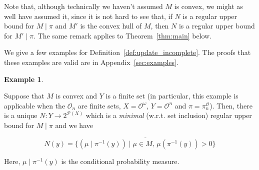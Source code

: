 \documentclass[11pt]{article}
\theoremstyle{definition}
\newtheorem{example}{Example}%
\theoremstyle{plain}
\newcommand{\Comment}[1]{}
\newcommand{\Nats}{\mathbb{N}}
\newcommand{\PM}{\mathcal{P}}
\newcommand{\Ob}{\mathcal{O}}
\newcommand{\OO}{\Ob^\omega}
\newcommand{\PO}{\pi^\Ob}
\newcommand{\PMO}{\PM(\OO)}
\begin{document}
Note that, although technically we haven't assumed $M$ is convex, we might as well have assumed it, since it is not hard to see that, if $N$ is a regular upper bound for $M \mid \pi$ and $M'$ is the convex hull of $M$, then $N$ is a regular upper bound for $M' \mid \pi$. The same remark applies to Theorem~\ref{thm:main} below.

We give a few examples for Definition~\ref{def:update_incomplete}. The proofs that these examples are valid are in Appendix~\ref{sec:examples}.

\begin{samepage}
\begin{example}
\label{exm:update_incomplete_finite}

Suppose that $M$ is convex and $Y$ is a finite set (in particular, this example is applicable when the $\Ob_n$ are finite sets, $X=\OO$, $Y=\Ob^n$ and $\pi=\PO_n$). Then, there is a unique $N: Y \rightarrow 2^{\PM(X)}$ which is a \emph{minimal} (w.r.t. set inclusion) regular upper bound for $M \mid \pi$ and we have

\begin{equation}
\label{eqn:exm__update_incomplete_finite}
N(y) = \overline{\{\left(\mu \mid \pi^{-1}(y)\right) \mid \mu \in M,\, \mu\left(\pi^{-1}(y)\right) > 0\}}
\end{equation}

Here, $\mu \mid \pi^{-1}(y)$ is the conditional probability measure.

\end{example}
\end{samepage}
%
\Comment{\begin{samepage}
\begin{example}

Suppose that $M$ is convex, for each $n \in \Nats$, $\Ob_n = [0,1]$ and for each $\nu \in M$ and $n \in \Nats$, $\PO_{n*}\nu$ is absolutely continuous w.r.t. the Lebesgue measure on $\Ob^n=[0,1]^n$ and its PDF (Radon-Nikodym derivative) is continuous and positive everywhere. Then, $M \mid \Ob^n$ is the closure of the set of all $(y,\mu) \in \Ob^n \times \PMO$ for which there exists $\nu \in M$ s.t. for any $m \geq n$ and $A \subseteq [0,1]^{m-n}$ measurable

\begin{equation}
\mu\left(\left(\PO_m\right)^{-1}(y \times A)\right)=\frac{\int_A \frac{d\PO_{m*}\nu(z)}{dz}\prod_{k=n}^{m-1} dz_k}{\int_{[0,1]^{m-n}} \frac{d\PO_{m*}\nu(z)}{dz}\prod_{k=n}^{m-1} dz_k}
\end{equation}

\end{example}
\end{samepage}}
\end{document}

